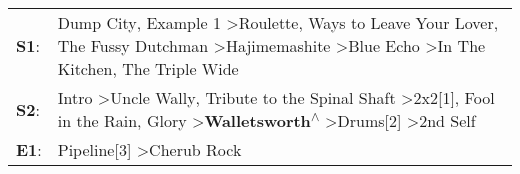 \begin{supertabular}{p{0.03\textwidth}p{0.92\textwidth}}
 \textbf{S1}:  &       Dump City\textsuperscript{}, \enspace Example 1\textsuperscript{} \textgreater \enspace Roulette\textsuperscript{},  Ways to Leave Your Lover\textsuperscript{}, \enspace The Fussy Dutchman\textsuperscript{} \textgreater \enspace Hajimemashite\textsuperscript{} \textgreater \enspace Blue Echo\textsuperscript{} \textgreater \enspace In The Kitchen\textsuperscript{}, \enspace The Triple Wide\textsuperscript{}  \enspace  \\
 \textbf{S2}:  &  Intro\textsuperscript{} \textgreater \enspace Uncle Wally\textsuperscript{}, \enspace Tribute to the Spinal Shaft\textsuperscript{} \textgreater \enspace 2x2[1]\textsuperscript{}, \enspace Fool in the Rain\textsuperscript{}, \enspace Glory\textsuperscript{} \textgreater \enspace \textbf{Walletsworth\textsuperscript{$\wedge$}} \textgreater \enspace Drums[2]\textsuperscript{} \textgreater \enspace 2nd Self\textsuperscript{}  \enspace  \\
 \textbf{E1}:  &                                                                                                                                                                                                                                                                                                                                                          Pipeline[3]\textsuperscript{} \textgreater \enspace Cherub Rock\textsuperscript{}  \enspace  \\
\end{supertabular}
